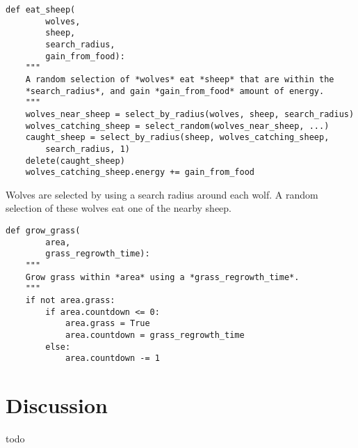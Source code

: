 \documentclass[10pt, a4paper]{article}
\begin{document}
\begin{lstlisting}
def eat_sheep(
        wolves,
        sheep,
        search_radius,
        gain_from_food):
    """
    A random selection of *wolves* eat *sheep* that are within the
    *search_radius*, and gain *gain_from_food* amount of energy.
    """
    wolves_near_sheep = select_by_radius(wolves, sheep, search_radius)
    wolves_catching_sheep = select_random(wolves_near_sheep, ...)
    caught_sheep = select_by_radius(sheep, wolves_catching_sheep,
        search_radius, 1)
    delete(caught_sheep)
    wolves_catching_sheep.energy += gain_from_food
\end{lstlisting}

Wolves are selected by using a search radius around each wolf. A random selection of these wolves eat one of the nearby sheep.

\begin{lstlisting}
def grow_grass(
        area,
        grass_regrowth_time):
    """
    Grow grass within *area* using a *grass_regrowth_time*.
    """
    if not area.grass:
        if area.countdown <= 0:
            area.grass = True
            area.countdown = grass_regrowth_time
        else:
            area.countdown -= 1
\end{lstlisting}

% 

\section{Discussion}
todo
\end{document}
